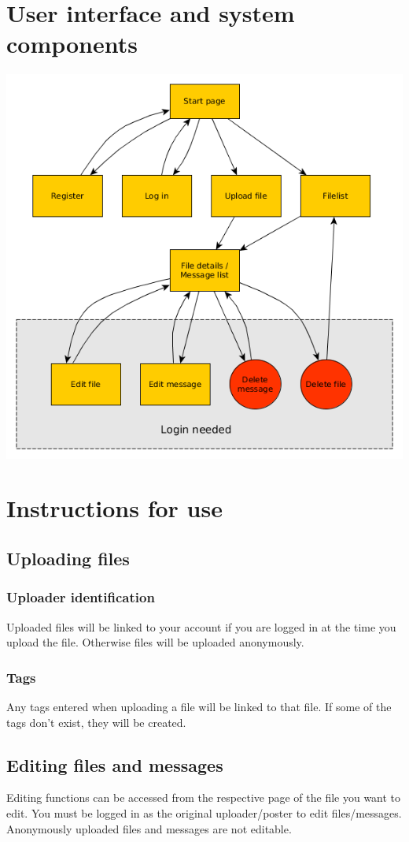\documentclass[10pt,a4paper]{article}
\begin{document}
\section{User interface and system components}
\includegraphics[scale=0.7]{diagrams/pageflow.png}

\section{Instructions for use}
\subsection{Uploading files}
\subsubsection{Uploader identification}
Uploaded files will be linked to your account if you are logged in at the time you upload the file. Otherwise files will be uploaded anonymously.
\subsubsection{Tags}
Any tags entered when uploading a file will be linked to that file. If some of the tags don't exist, they will be created.

\subsection{Editing files and messages}
Editing functions can be accessed from the respective page of the file you want to edit. You must be logged in as the original uploader/poster to edit files/messages. Anonymously uploaded files and messages are not editable.
\section{}
\end{document}

